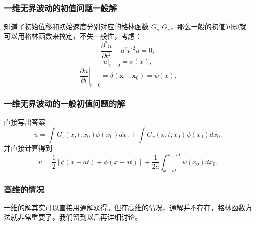 \documentclass[CJK]{beamer}
\begin{document}
\begin{frame}
  \frametitle{一维无界波动的初值问题一般解}
  知道了初始位移和初始速度分别对应的格林函数 $G_s, G_v$，那么一般的初值问题就可以用格林函数来搞定，不失一般性，考虑：
  $$\frac{\partial^2u}{\partial t^2}-a^2\nabla^2 u = 0, $$
  $$\left. u\right\vert_{t=0} = \phi(x),$$
  $$\left. \frac{\partial u}{\partial t}\right\vert_{t=0} = \delta(\mathbf{x}-\mathbf{x}_0) = \psi(x).$$  
\end{frame}


\begin{frame}
  \frametitle{一维无界波动的一般初值问题的解}
  直接写出答案
  $$ u = \int G_s(x,t;x_0) \phi(x_0)dx_0 + \int G_v(x,t;x_0) \psi(x_0)dx_0.$$
  并直接计算得到
  $$ u = \frac{1}{2}\left[\phi(x-at)+\phi(x+at)\right] + \frac{1}{2a}\int_{x-at}^{x+at}\psi(x_0)dx_0.$$
\end{frame}



\begin{frame}
  \frametitle{高维的情况}
  一维的解其实可以直接用通解获得。但在高维的情况，通解并不存在，格林函数方法就非常重要了。我们留到以后再详细讨论。
\end{frame}

\ech
\end{document}
